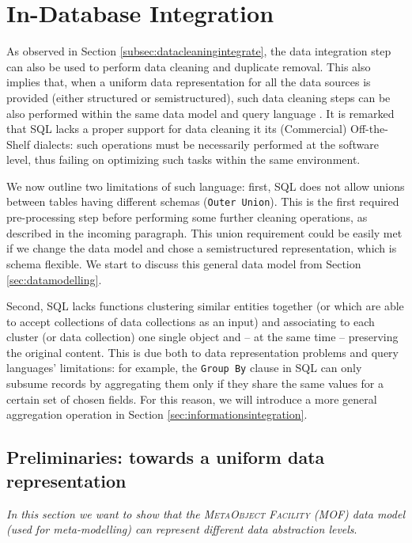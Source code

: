 \section{In-Database Integration}\label{sec:indatabase}
As observed in Section \ref{subsec:datacleaningintegrate}, the data integration step can also be used to perform data cleaning and duplicate removal. This also implies that, when a uniform data representation for all the data sources is provided (either structured or semistructured), such data cleaning steps can be also performed within the same data model and query language \cite{deII}. It is remarked that SQL lacks a proper support for data cleaning it its 
(Commercial) Off-the-Shelf dialects: such operations must be necessarily performed at the software level, thus failing on optimizing such tasks within the same environment. 

We now outline two limitations of such language: first, SQL  does not allow  unions between tables having different schemas (\texttt{Outer Union}). This  is the first required pre-processing step before performing some further cleaning operations, as described in the incoming paragraph. This union requirement could be easily met if we change the data model and chose a semistructured representation, which is schema flexible. We start to discuss this general data model from Section \vref{sec:datamodelling}. 

Second, SQL lacks  functions clustering similar entities together (or which are able to accept collections of data collections as an input) and associating to each cluster (or data collection) one single object and -- at the same time -- preserving the original content. This is due both to data representation problems and query languages' limitations: for example, the \texttt{Group By} clause in SQL can only subsume records by aggregating them only if they share the same values for a certain set of chosen fields. For this reason, we will introduce a more general aggregation operation in Section \vref{sec:informationsintegration}.

\subsection{Preliminaries: towards a uniform data representation}\label{sec:datamodelling}
\textit{In this section we want to show that the \textsc{MetaObject Facility} (MOF) data model (used for meta-modelling) can represent different data abstraction levels}.

